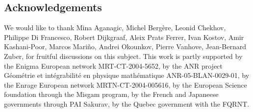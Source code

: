 \subsection*{Acknowledgements}

We would like to thank Mina Aganagic, Michel Berg\`ere, Leonid Chekhov, Philippe Di Francesco, Robert Dijkgraaf, Aleix Prats Ferrer, Ivan Kostov, Amir Kashani-Poor, Marcos Mari\~no, Andrei Okounkov, Pierre Vanhove, Jean-Bernard Zuber, for fruitful discussions on this subject.
This work is partly supported by the Enigma European network MRT-CT-2004-5652, by the ANR project G\'eom\'etrie et int\'egrabilit\'e en physique math\'ematique ANR-05-BLAN-0029-01,
 by the Enrage European network MRTN-CT-2004-005616, 
 by the European Science foundation through the Misgam program,
 by the French and Japaneese governments through PAI Sakurav, by the Quebec government with the FQRNT.














